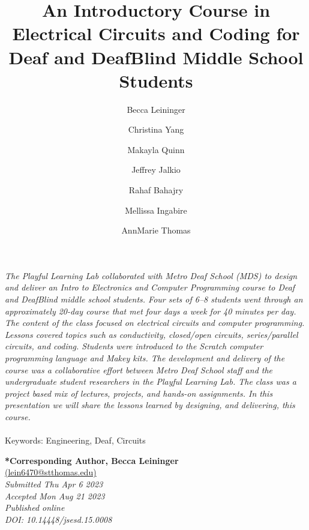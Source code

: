 \documentclass[11.5pt]{sig-alternate}
\makeatletter
\let\oldabstract\abstract
\let\oldendabstract\endabstract
\renewenvironment{abstract}
{\renewenvironment{quotation}%
               {\list{}{\addtolength{\leftmargin}{1em} %
                        \listparindent 1.5em%
                        \itemindent    \listparindent%
                        \rightmargin   \leftmargin%
                        \parsep        \z@ \@plus\p@}%
                \item\relax}%
               {\endlist}%
\oldabstract}
{\oldendabstract}
\makeatother
\begin{document}
\title{An Introductory Course in Electrical Circuits and Coding for Deaf and DeafBlind Middle School Students}

\author[0]{\large \color{blue} Becca Leininger}
\author[1]{\large \color{blue}Christina Yang}
\author[1]{\large \color{blue}Makayla Quinn}
\author[1]{\large \color{blue}Jeffrey Jalkio}
\author[1]{\large \color{blue}Rahaf Bahajry}
\author[1]{\large \color{blue}Mellissa Ingabire}
\author[1]{\large \color{blue}AnnMarie Thomas}
\toappear{}

\maketitle
\begin{@twocolumnfalse} 
\begin{abstract}
\item 
 \textit{The Playful Learning Lab collaborated with Metro Deaf School (MDS) to design and deliver an Intro to Electronics and Computer Programming course to Deaf and DeafBlind middle school students. Four sets of 6–8 students went through an approximately 20-day course that met four days a week for 40 minutes per day. The content of the class focused on electrical circuits and computer programming. Lessons covered topics such as conductivity, closed/open circuits, series/parallel circuits, and coding. Students were introduced to the Scratch computer programming language and Makey kits. The development and delivery of the course was a collaborative effort between Metro Deaf School staff and the undergraduate student researchers in the Playful Learning Lab. The class was a project based mix of lectures, projects, and
hands-on assignments. In this presentation we will share the lessons learned by designing, and delivering, this course.}
     \\
     \\
     Keywords: Engineering, Deaf, Circuits
\end{abstract}
\end{@twocolumnfalse}





\textbf{*Corresponding Author,  Becca Leininger}\\
\href{mailto: lein6470@stthomas.edu}{(lein6470@stthomas.edu)} \\
\textit{Submitted Thu Apr 6 2023 }\\
\textit{Accepted Mon Aug 21 2023} \\
\textit{Published online } \\
\textit{DOI: 10.14448/jsesd.15.0008} \\
\pagebreak
\pagebreak
\end{document}
